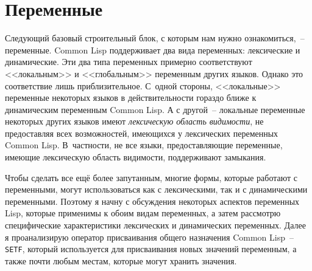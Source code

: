 \chapter{Переменные}
\label{ch:06}

\thispagestyle{empty}

Следующий базовый строительный блок, с которым нам нужно ознакомиться,~--
переменные. Common Lisp поддерживает два вида переменных: лексические и
динамические. Эти два типа переменных примерно соответствуют
<<локальным>> и <<глобальным>> переменным других языков. Однако это соответствие лишь
приблизительное. С~одной стороны, <<локальные>> переменные некоторых языков в
действительности гораздо ближе к динамическим переменным Common Lisp. А с
другой~-- локальные переменные некоторых других языков имеют \textit{лексическую область
  видимости}, не предоставляя всех возможностей, имеющихся у лексических переменных
Common Lisp. В~частности, не все языки, предоставляющие переменные, имеющие лексическую
область видимости, поддерживают замыкания.

Чтобы сделать все ещё более запутанным, многие формы, которые работают с переменными,
могут использоваться как с лексическими, так и с динамическими переменными. Поэтому я
начну с обсуждения некоторых аспектов переменных Lisp, которые применимы к обоим видам
переменных, а затем рассмотрю специфические харак\-те\-рис\-ти\-ки лексических и динамических
переменных. Далее я проанализирую оператор присваивания общего назначения Common Lisp~--
\lstinline{SETF}, который используется для присваивания новых значений переменным, а также
почти любым местам, которые могут хранить значения.

